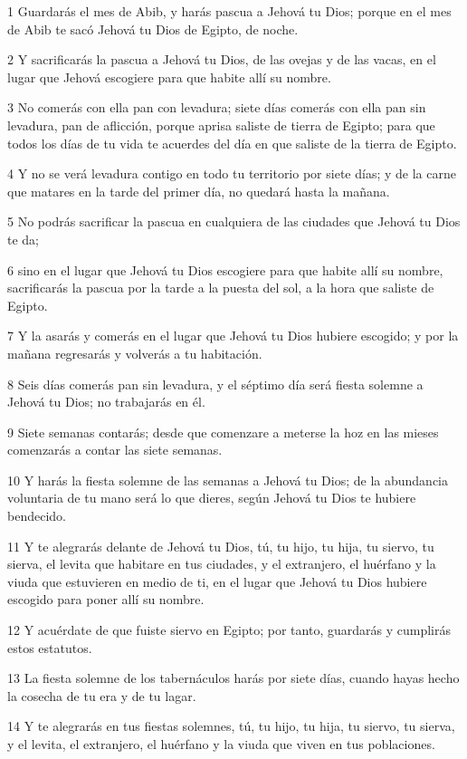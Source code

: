 \par 1 Guardarás el mes de Abib, y harás pascua  a Jehová tu Dios; porque en el mes de Abib te sacó Jehová tu Dios de Egipto, de noche.
\par 2 Y sacrificarás la pascua a Jehová tu Dios, de las ovejas y de las vacas, en el lugar que Jehová escogiere para que habite allí su nombre.
\par 3 No comerás con ella pan con levadura; siete días comerás con ella pan sin levadura, pan de aflicción, porque aprisa saliste de tierra de Egipto; para que todos los días de tu vida te acuerdes del día en que saliste de la tierra de Egipto.
\par 4 Y no se verá levadura contigo en todo tu territorio por siete días; y de la carne que matares en la tarde del primer día, no quedará hasta la mañana.
\par 5 No podrás sacrificar la pascua en cualquiera de las ciudades que Jehová tu Dios te da;
\par 6 sino en el lugar que Jehová tu Dios escogiere para que habite allí su nombre, sacrificarás la pascua por la tarde a la puesta del sol, a la hora que saliste de Egipto.
\par 7 Y la asarás y comerás en el lugar que Jehová tu Dios hubiere escogido; y por la mañana regresarás y volverás a tu habitación.
\par 8 Seis días comerás pan sin levadura, y el séptimo día será fiesta solemne a Jehová tu Dios; no trabajarás en él.
\par 9 Siete semanas contarás; desde que comenzare a meterse la hoz en las mieses comenzarás a contar las siete semanas.
\par 10 Y harás la fiesta solemne de las semanas  a Jehová tu Dios; de la abundancia voluntaria de tu mano será lo que dieres, según Jehová tu Dios te hubiere bendecido.
\par 11 Y te alegrarás delante de Jehová tu Dios, tú, tu hijo, tu hija, tu siervo, tu sierva, el levita que habitare en tus ciudades, y el extranjero, el huérfano y la viuda que estuvieren en medio de ti, en el lugar que Jehová tu Dios hubiere escogido para poner allí su nombre.
\par 12 Y acuérdate de que fuiste siervo en Egipto; por tanto, guardarás y cumplirás estos estatutos.
\par 13 La fiesta solemne de los tabernáculos harás por siete días, cuando hayas hecho la cosecha de tu era y de tu lagar.
\par 14 Y te alegrarás en tus fiestas solemnes, tú, tu hijo, tu hija, tu siervo, tu sierva, y el levita, el extranjero, el huérfano y la viuda que viven en tus poblaciones.

